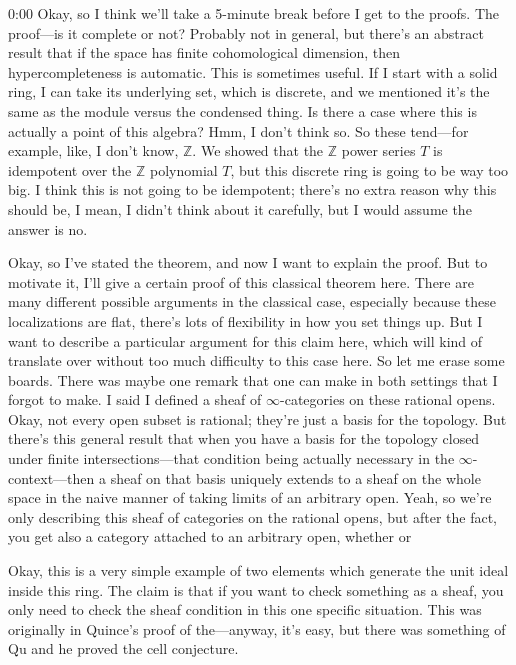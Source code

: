 \begin{unfinished}{0:00}
Okay, so I think we'll take a 5-minute break before I get to the proofs. The proof---is it complete or not? Probably not in general, but there's an abstract result that if the space has finite cohomological dimension, then hypercompleteness is automatic. This is sometimes useful. If I start with a solid ring, I can take its underlying set, which is discrete, and we mentioned it's the same as the module versus the condensed thing. Is there a case where this is actually a point of this algebra? Hmm, I don't think so. So these tend---for example, like, I don't know, $\mathbb{Z}$. We showed that the $\mathbb{Z}$ power series $T$ is idempotent over the $\mathbb{Z}$ polynomial $T$, but this discrete ring is going to be way too big. I think this is not going to be idempotent; there's no extra reason why this should be, I mean, I didn't think about it carefully, but I would assume the answer is no.

Okay, so I've stated the theorem, and now I want to explain the proof. But to motivate it, I'll give a certain proof of this classical theorem here. There are many different possible arguments in the classical case, especially because these localizations are flat, there's lots of flexibility in how you set things up. But I want to describe a particular argument for this claim here, which will kind of translate over without too much difficulty to this case here. So let me erase some boards. There was maybe one remark that one can make in both settings that I forgot to make. I said I defined a sheaf of $\infty$-categories on these rational opens. Okay, not every open subset is rational; they're just a basis for the topology. But there's this general result that when you have a basis for the topology closed under finite intersections---that condition being actually necessary in the $\infty$-context---then a sheaf on that basis uniquely extends to a sheaf on the whole space in the naive manner of taking limits of an arbitrary open. Yeah, so we're only describing this sheaf of categories on the rational opens, but after the fact, you get also a category attached to an arbitrary open, whether or

Okay, this is a very simple example of two elements which generate the unit ideal inside this ring. The claim is that if you want to check something as a sheaf, you only need to check the sheaf condition in this one specific situation. This was originally in Quince's proof of the---anyway, it's easy, but there was something of Qu and he proved the cell conjecture.


\end{unfinished}
